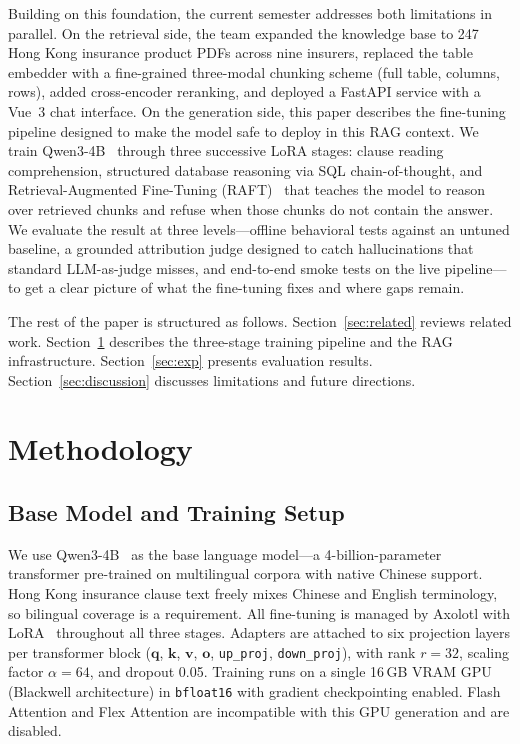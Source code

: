 Building on this foundation, the current semester addresses both limitations
in parallel.
On the retrieval side, the team expanded the knowledge base to 247 Hong Kong
insurance product PDFs across nine insurers, replaced the table embedder with
a fine-grained three-modal chunking scheme (full table, columns, rows), added
cross-encoder reranking, and deployed a FastAPI service with a Vue~3 chat
interface.
On the generation side, this paper describes the fine-tuning pipeline designed
to make the model safe to deploy in this RAG context.
We train Qwen3-4B~\cite{qwen3} through three successive LoRA stages: clause
reading comprehension, structured database reasoning via SQL chain-of-thought,
and Retrieval-Augmented Fine-Tuning (RAFT)~\cite{zhang2024raft} that teaches
the model to reason over retrieved chunks and refuse when those chunks do not
contain the answer.
We evaluate the result at three levels---offline behavioral tests against an
untuned baseline, a grounded attribution judge designed to catch hallucinations
that standard LLM-as-judge misses, and end-to-end smoke tests on the live
pipeline---to get a clear picture of what the fine-tuning fixes and where gaps
remain.

The rest of the paper is structured as follows.
Section~\ref{sec:related} reviews related work.
Section~\ref{sec:method} describes the three-stage training pipeline and
the RAG infrastructure.
Section~\ref{sec:exp} presents evaluation results.
Section~\ref{sec:discussion} discusses limitations and future directions.

\section{Methodology}
\label{sec:method}

\subsection{Base Model and Training Setup}

We use Qwen3-4B~\cite{qwen3} as the base language model---a 4-billion-parameter
transformer pre-trained on multilingual corpora with native Chinese support.
Hong Kong insurance clause text freely mixes Chinese and English terminology,
so bilingual coverage is a requirement.
All fine-tuning is managed by Axolotl with LoRA~\cite{hu2022lora} throughout
all three stages.
Adapters are attached to six projection layers per transformer block
($\mathbf{q}$, $\mathbf{k}$, $\mathbf{v}$, $\mathbf{o}$, \texttt{up\_proj},
\texttt{down\_proj}), with rank $r{=}32$, scaling factor $\alpha{=}64$, and
dropout 0.05.
Training runs on a single 16\,GB VRAM GPU (Blackwell architecture) in
\texttt{bfloat16} with gradient checkpointing enabled.
Flash Attention and Flex Attention are incompatible with this GPU generation
and are disabled.

